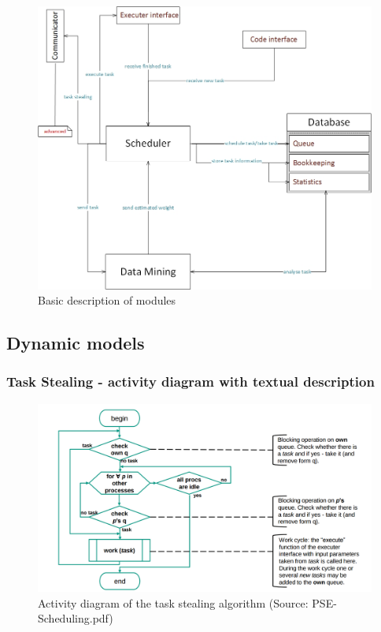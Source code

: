 \vspace{1cm}
\begin{figure}[H]
	\includegraphics[width=.9\textwidth,height=.9\textheight,keepaspectratio]	{images/modules.jpg}
	\caption{Basic description of modules}
\end{figure}
\newpage

\subsection{Dynamic models}
\subsubsection{Task Stealing - activity diagram with textual description}
\vspace{1.5cm}
\begin{figure}[H]
	\includegraphics[width=15cm]{images/task_stealing_pap.jpg}
	\caption{Activity diagram of the task stealing algorithm (Source: PSE-Scheduling.pdf)}
\end{figure}

